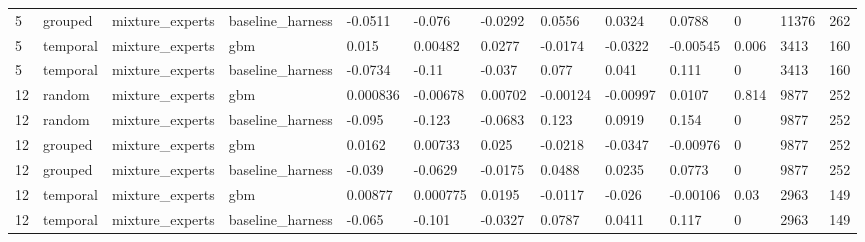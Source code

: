 \begin{tabular}{lllllllllllll}
5 & grouped & mixture\_experts & baseline\_harness & -0.0511 & -0.076 & -0.0292 & 0.0556 & 0.0324 & 0.0788 & 0 & 11376 & 262 \\
5 & temporal & mixture\_experts & gbm & 0.015 & 0.00482 & 0.0277 & -0.0174 & -0.0322 & -0.00545 & 0.006 & 3413 & 160 \\
5 & temporal & mixture\_experts & baseline\_harness & -0.0734 & -0.11 & -0.037 & 0.077 & 0.041 & 0.111 & 0 & 3413 & 160 \\
12 & random & mixture\_experts & gbm & 0.000836 & -0.00678 & 0.00702 & -0.00124 & -0.00997 & 0.0107 & 0.814 & 9877 & 252 \\
12 & random & mixture\_experts & baseline\_harness & -0.095 & -0.123 & -0.0683 & 0.123 & 0.0919 & 0.154 & 0 & 9877 & 252 \\
12 & grouped & mixture\_experts & gbm & 0.0162 & 0.00733 & 0.025 & -0.0218 & -0.0347 & -0.00976 & 0 & 9877 & 252 \\
12 & grouped & mixture\_experts & baseline\_harness & -0.039 & -0.0629 & -0.0175 & 0.0488 & 0.0235 & 0.0773 & 0 & 9877 & 252 \\
12 & temporal & mixture\_experts & gbm & 0.00877 & 0.000775 & 0.0195 & -0.0117 & -0.026 & -0.00106 & 0.03 & 2963 & 149 \\
12 & temporal & mixture\_experts & baseline\_harness & -0.065 & -0.101 & -0.0327 & 0.0787 & 0.0411 & 0.117 & 0 & 2963 & 149 \\
\bottomrule
\end{tabular}
